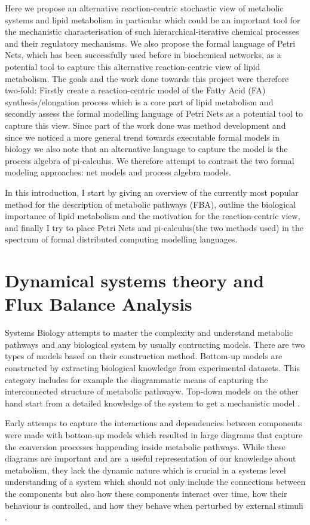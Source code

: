 Here we propose an alternative reaction-centric stochastic view of metabolic
systems and lipid metabolism in particular which could be an important
tool for the mechanistic characterisation of such
hierarchical-iterative chemical processes and their regulatory
mechanisms. 
We also propose the formal language of Petri
Nets, which has been successfully used before in biochemical networks,
as a potential tool to capture this alternative reaction-centric view
of lipid metabolism. The goals and the work done towards this project were therefore two-fold:
Firstly create a reaction-centric model of the Fatty Acid (FA)
synthesis/elongation process which is a core part of lipid
metabolism and secondly assess the formal modelling language of Petri
Nets as a potential tool to capture this view. Since part of the work
done was method development and since we noticed a more
general trend towards executable formal models in biology \cite [] {fisher2007executable} we also
note that an alternative language to capture the model is the process
algebra of  pi-calculus. We therefore attempt to contrast the two formal
modeling approaches: net models and process algebra models.

In this introduction, I start by giving an overview of the currently most popular
method for the description of metabolic pathways (FBA),
outline the biological importance of lipid metabolism and the
motivation for the reaction-centric view, and finally I try to place
Petri Nets and pi-calculus(the two methods used) in the spectrum
of formal
distributed computing modelling languages.

\section{Dynamical systems theory and Flux Balance Analysis}
Systems Biology attempts to master the complexity and understand metabolic
pathways and any biological system by usually contructing
models. There are two types of models based on their construction
method. Bottom-up models are constructed by extracting biological
knowledge from experimental datasets. This category includes for
example the diagrammatic means of capturing the interconnected
structure of metabolic pathwayw. Top-down models on the other hand
start from a detailed knowledge of the system to get a mechanistic
model \cite [] {schneider2013understanding}.

Early attemps to capture the interactions and dependencies between
components were made with bottom-up models which resulted in large diagrams that
capture the conversion processes happending inside metabolic pathways. While these
diagrams are important and are a useful representation of our knowledge
about metabolism, they lack the dynamic nature which is crucial in a
systems level understanding of a system which should not only include
the connections between the components but also how these components
interact over time, how their behaviour is
controlled, and how they behave when perturbed by external stimuli \cite [] {kitano2002systems}.

